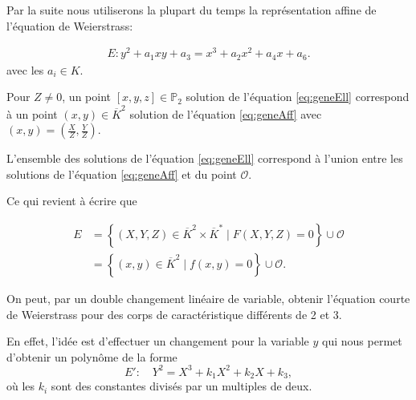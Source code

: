 
Par la suite nous utiliserons la plupart du temps la représentation affine de
l'équation de Weierstrass:

\begin{align}
    \label{eq:geneAff}
E : y^2 + a_1xy + a_3 = x^3 +a_2x^2+a_4x+a_6
.\end{align}
avec les $a_{i} \in K$. 

Pour $Z \neq 0$, un point $[x,y,z] \in \mathbb{P}_{2}$ solution de l'équation
\eqref{eq:geneEll} correspond à un point $(x,y) \in \overline{K}^2$ solution de
l'équation \eqref{eq:geneAff} avec $(x,y)=(\frac{X}{Z},\frac{Y}{Z})$.

L'ensemble des solutions de l'équation \eqref{eq:geneEll} correspond à l'union entre les
solutions de l'équation \eqref{eq:geneAff} et du point $\mathcal{O}$.

Ce qui revient à écrire que

\begin{align*}
    E &= \left\{ (X,Y,Z) \in \overline{K}^2 \times \overline{K}^{*} \mid F(X,Y,Z) = 0 \right\}  \cup
{\mathcal{O}} \\
&= \left\{ (x,y) \in \overline{K}^2 \mid f(x,y) = 0 \right\} \cup {\mathcal{O}}
.\end{align*}

On peut, par un double changement linéaire de variable, obtenir l'équation courte de Weierstrass
pour des corps de caractéristique différents de 2 et 3.

En effet, l'idée est d'effectuer un changement pour la variable $y$ qui nous permet
d'obtenir un polynôme de la forme
\[
E' :\quad Y^2 = X^3 + k_1X^2 + k_2X + k_3
,\] 
où les $k_{i}$ sont des constantes divisés par un multiples de deux.

